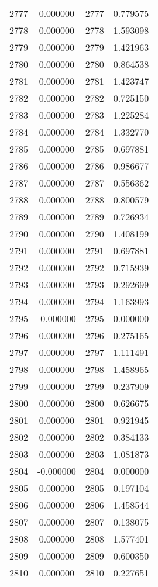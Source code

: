 \documentclass[12pt]{article}
\begin{document}
\begin{longtable}{@{}cccc@{}}
2777 & 0.000000 & 2777 & 0.779575 \\
2778 & 0.000000 & 2778 & 1.593098 \\
2779 & 0.000000 & 2779 & 1.421963 \\
2780 & 0.000000 & 2780 & 0.864538 \\
2781 & 0.000000 & 2781 & 1.423747 \\
2782 & 0.000000 & 2782 & 0.725150 \\
2783 & 0.000000 & 2783 & 1.225284 \\
2784 & 0.000000 & 2784 & 1.332770 \\
2785 & 0.000000 & 2785 & 0.697881 \\
2786 & 0.000000 & 2786 & 0.986677 \\
2787 & 0.000000 & 2787 & 0.556362 \\
2788 & 0.000000 & 2788 & 0.800579 \\
2789 & 0.000000 & 2789 & 0.726934 \\
2790 & 0.000000 & 2790 & 1.408199 \\
2791 & 0.000000 & 2791 & 0.697881 \\
2792 & 0.000000 & 2792 & 0.715939 \\
2793 & 0.000000 & 2793 & 0.292699 \\
2794 & 0.000000 & 2794 & 1.163993 \\
2795 & -0.000000 & 2795 & 0.000000 \\
2796 & 0.000000 & 2796 & 0.275165 \\
2797 & 0.000000 & 2797 & 1.111491 \\
2798 & 0.000000 & 2798 & 1.458965 \\
2799 & 0.000000 & 2799 & 0.237909 \\
2800 & 0.000000 & 2800 & 0.626675 \\
2801 & 0.000000 & 2801 & 0.921945 \\
2802 & 0.000000 & 2802 & 0.384133 \\
2803 & 0.000000 & 2803 & 1.081873 \\
2804 & -0.000000 & 2804 & 0.000000 \\
2805 & 0.000000 & 2805 & 0.197104 \\
2806 & 0.000000 & 2806 & 1.458544 \\
2807 & 0.000000 & 2807 & 0.138075 \\
2808 & 0.000000 & 2808 & 1.577401 \\
2809 & 0.000000 & 2809 & 0.600350 \\
2810 & 0.000000 & 2810 & 0.227651 \\

\end{longtable}
\end{document}
